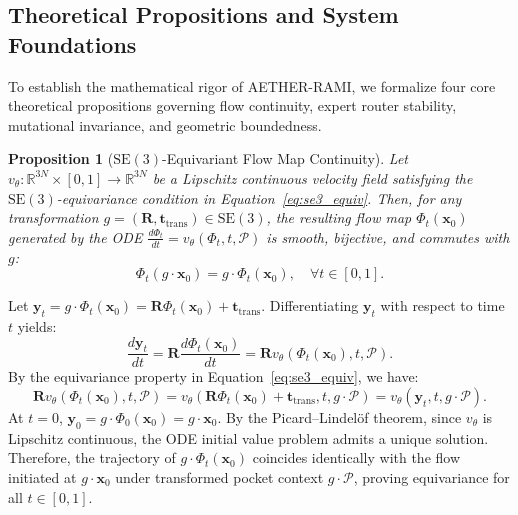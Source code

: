 \documentclass[10pt,journal,compsoc]{IEEEtran}
\newtheorem{proposition}{Proposition}
\begin{document}
\subsection{Theoretical Propositions and System Foundations}
To establish the mathematical rigor of AETHER-RAMI, we formalize four core theoretical propositions governing flow continuity, expert router stability, mutational invariance, and geometric boundedness.

\begin{proposition}[$\mathrm{SE}(3)$-Equivariant Flow Map Continuity]
\label{prop:se3_continuity}
Let $v_\theta: \mathbb{R}^{3N} \times [0, 1] \to \mathbb{R}^{3N}$ be a Lipschitz continuous velocity field satisfying the $\mathrm{SE}(3)$-equivariance condition in Equation~\eqref{eq:se3_equiv}. Then, for any transformation $g = (\mathbf{R}, \mathbf{t}_{\text{trans}}) \in \mathrm{SE}(3)$, the resulting flow map $\Phi_t(\mathbf{x}_0)$ generated by the ODE $\frac{d\Phi_t}{dt} = v_\theta(\Phi_t, t, \mathcal{P})$ is smooth, bijective, and commutes with $g$:
\begin{equation}
\Phi_t(g \cdot \mathbf{x}_0) = g \cdot \Phi_t(\mathbf{x}_0), \quad \forall t \in [0, 1].
\end{equation}
\end{proposition}

\begin{IEEEproof}
Let $\mathbf{y}_t = g \cdot \Phi_t(\mathbf{x}_0) = \mathbf{R} \Phi_t(\mathbf{x}_0) + \mathbf{t}_{\text{trans}}$. Differentiating $\mathbf{y}_t$ with respect to time $t$ yields:
\begin{equation*}
\frac{d\mathbf{y}_t}{dt} = \mathbf{R} \frac{d\Phi_t(\mathbf{x}_0)}{dt} = \mathbf{R} v_\theta(\Phi_t(\mathbf{x}_0), t, \mathcal{P}).
\end{equation*}
By the equivariance property in Equation~\eqref{eq:se3_equiv}, we have:
\begin{equation*}
\mathbf{R} v_\theta(\Phi_t(\mathbf{x}_0), t, \mathcal{P}) = v_\theta(\mathbf{R} \Phi_t(\mathbf{x}_0) + \mathbf{t}_{\text{trans}}, t, g \cdot \mathcal{P}) = v_\theta(\mathbf{y}_t, t, g \cdot \mathcal{P}).
\end{equation*}
At $t=0$, $\mathbf{y}_0 = g \cdot \Phi_0(\mathbf{x}_0) = g \cdot \mathbf{x}_0$. By the Picard--Lindel{\"o}f theorem, since $v_\theta$ is Lipschitz continuous, the ODE initial value problem admits a unique solution. Therefore, the trajectory of $g \cdot \Phi_t(\mathbf{x}_0)$ coincides identically with the flow initiated at $g \cdot \mathbf{x}_0$ under transformed pocket context $g \cdot \mathcal{P}$, proving equivariance for all $t \in [0, 1]$.
\end{IEEEproof}
\end{document}
